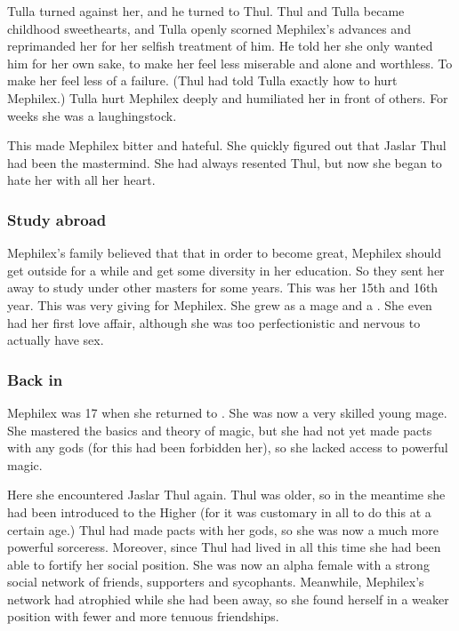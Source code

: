 Tulla turned against her, and he turned to Thul.
Thul and Tulla became childhood sweethearts, and Tulla openly scorned Mephilex's advances and reprimanded her for her selfish treatment of him.
He told her she only wanted him for her own sake, to make her feel less miserable and alone and worthless.
To make her feel less of a failure. 
(Thul had told Tulla exactly how to hurt Mephilex.) 
Tulla hurt Mephilex deeply and humiliated her in front of others. 
For weeks she was a laughingstock.

This made Mephilex bitter and hateful. 
She quickly figured out that Jaslar Thul had been the mastermind. 
She had always resented Thul, but now she began to hate her with all her heart. 





\subsubsection{Study abroad}
Mephilex's family believed that that in order to become great, Mephilex should get outside \Yormis for a while and get some diversity in her education.
So they sent her away to study under other masters for some years.
This was her 15th and 16th year.
This was very giving for Mephilex.
She grew as a mage and a \sphyle. 
She even had her first love affair, although she was too perfectionistic and nervous to actually have sex. 





\subsubsection{Back in \Yormis}
Mephilex was 17 when she returned to \Yormis. 
She was now a very skilled young mage.
She mastered the basics and theory of magic, but she had not yet made pacts with any gods (for this had been forbidden her), so she lacked access to powerful magic. 

Here she encountered Jaslar Thul again. 
Thul was older, so in the meantime she had been introduced to the Higher \Arcana (for it was customary in all \Yormis to do this at a certain age.)
Thul had made pacts with her gods, so she was now a much more powerful sorceress.
Moreover, since Thul had lived in \Yormis all this time she had been able to fortify her social position.
She was now an alpha female with a strong social network of friends, supporters and sycophants. 
Meanwhile, Mephilex's network had atrophied while she had been away, so she found herself in a weaker position with fewer and more tenuous friendships. 

